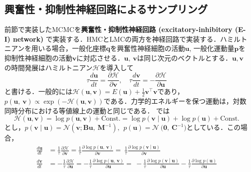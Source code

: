 \subsection{興奮性・抑制性神経回路によるサンプリング}
前節で実装したMCMCを\textbf{興奮性・抑制性神経回路 (excitatory-inhibitory (E-I) network)} で実装する．HMCとLMCの両方を神経回路で実装する．ハミルトニアンを用いる場合，一般化座標$\mathbf{q}$を興奮性神経細胞の活動$\mathbf{u}$, 一般化運動量$\mathbf{p}$を抑制性神経細胞の活動$\mathbf{v}$に対応させる．$\mathbf{u,\ v}$は同じ次元のベクトルとする．$\mathbf{u}, \mathbf{v}$の時間発展はハミルトニアン$\mathcal{H}$を導入して
\begin{equation}
\tau\frac{d\mathbf{u}}{dt} = \frac{\partial \mathcal{H}}{\partial\mathbf{v}},\quad\tau\frac{d\mathbf{v}}{dt} = - \frac{\partial \mathcal{H}}{\partial\mathbf{u}}
\end{equation}
と書ける．一般的には$\mathcal{H}(\mathbf{u}, \mathbf{v}) = E\left( \mathbf{u} \right) + \frac{1}{2}\mathbf{v}^{\top}\mathbf{v}$であり，$p\left( \mathbf{u},\ \mathbf{v} \right) \propto \exp( - \mathcal{H}(\mathbf{u,v}))$である．力学的エネルギーを保つ運動は，対数同時分布における等値線上の運動と同じである．
\citep{Aitchison2016-xu}では
\begin{equation}
\mathcal{H}(\mathbf{u}, \mathbf{v}) = \log p \left(\mathbf{u}, \mathbf{v} \right) + \textrm{Const.} = \log p \left(\mathbf{v} \middle| \mathbf{u} \right) + \log p\left(\mathbf{u} \right) + \textrm{Const.}
\end{equation}
とし，$p\left( \mathbf{v} \middle| \mathbf{u} \right)\mathcal{= N}\left( \mathbf{v};\mathbf{Bu},\ \mathbf{M}^{- 1} \right),\ \ p\left( \mathbf{u} \right) = \mathcal{N\ (}\mathbf{0},\ \mathbf{C}^{- 1})$としている．この場合，
\begin{align}
\frac{d\mathbf{u}}{dt} &= \frac{1}{\tau}\frac{\partial \mathcal{H}}{\partial\mathbf{v}} = \frac{1}{\tau}\frac{\partial\log{p\left( \mathbf{u},\ \mathbf{v} \right)}}{\partial\mathbf{v}} = \ \frac{1}{\tau}\frac{\partial\log{p\left( \mathbf{v} \middle| \mathbf{u} \right)}}{\partial\mathbf{v}}\\
\frac{d\mathbf{v}}{dt} &= - \frac{1}{\tau}\frac{\partial \mathcal{H}}{\partial\mathbf{u}} = - \frac{1}{\tau}\frac{\partial\log{p\left( \mathbf{u},\ \mathbf{v} \right)}}{\partial\mathbf{u}} = \  - \frac{1}{\tau}\frac{\partial\log{p\left( \mathbf{v} \middle| \mathbf{u} \right)}}{\partial\mathbf{u}} - \frac{1}{\tau}\frac{\partial\log{p\left( \mathbf{u} \right)}}{\partial\mathbf{u}}
\end{align}
